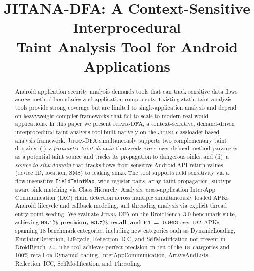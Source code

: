 \documentclass[conference]{IEEEtran}
\begin{document}
\title{JITANA-DFA: A Context-Sensitive Interprocedural\\
Taint Analysis Tool for Android Applications}

\author{
}

\maketitle

\begin{abstract}
Android application security analysis demands tools that can track sensitive
data flows across method boundaries and application components. Existing static
taint analysis tools provide strong coverage but are limited to
single-application analysis and depend on heavyweight compiler frameworks that
fail to scale to modern real-world applications. In this paper we present
\textsc{Jitana-DFA}, a context-sensitive, demand-driven interprocedural taint
analysis tool built natively on the \textsc{Jitana} classloader-based analysis
framework. \textsc{Jitana-DFA} simultaneously supports two complementary taint
domains: (i)~a \emph{parameter taint domain} that seeds every user-defined
method parameter as a potential taint source and tracks its propagation to
dangerous sinks, and (ii)~a \emph{source-to-sink domain} that tracks flows from
sensitive Android API return values (device ID, location, SMS) to leaking sinks.
The tool supports field sensitivity via a flow-insensitive
\texttt{FieldTaintMap}, wide-register pairs, array taint propagation,
subtype-aware sink matching via Class Hierarchy Analysis, cross-application
Inter-App Communication (IAC) chain detection across multiple simultaneously
loaded APKs, Android lifecycle and callback modeling, and threading analysis via
explicit thread entry-point seeding. We evaluate \textsc{Jitana-DFA} on the
DroidBench~3.0 benchmark suite, achieving \textbf{89.1\% precision, 83.7\%
recall, and F1~=~0.863} over 182~APKs spanning 18 benchmark categories,
including new categories such as DynamicLoading, EmulatorDetection, Lifecycle,
Reflection~ICC, and SelfModification not present in DroidBench~2.0. The tool
achieves perfect precision on ten of the 18~categories and 100\% recall on
DynamicLoading, InterAppCommunication, ArraysAndLists, Reflection~ICC,
SelfModification, and Threading.
\end{abstract}
\end{document}
